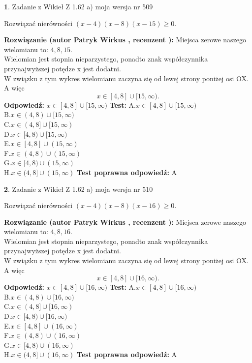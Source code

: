 \documentclass[12pt, a4paper]{article}
\theoremstyle{definition} %
\newtheorem{zad}{}
\newcommand{\zadStart}[1]{\begin{zad}#1\newline}
\newcommand{\zadStop}{\end{zad}}
\newcommand{\rozwStart}[2]{\noindent \textbf{Rozwiązanie (autor #1 , recenzent #2): }\newline}
\newcommand{\rozwStop}{\newline}
\newcommand{\odpStart}{\noindent \textbf{Odpowiedź:}\newline}
\newcommand{\odpStop}{\newline}
\newcommand{\testStart}{\noindent \textbf{Test:}\newline}
\newcommand{\testStop}{\newline}
\newcommand{\kluczStart}{\noindent \textbf{Test poprawna odpowiedź:}\newline}
\newcommand{\kluczStop}{\newline}
\begin{document}
\zadStart{Zadanie z Wikieł Z 1.62 a) moja wersja nr 509}

Rozwiązać nierówności $(x-4)(x-8)(x-15)\ge0$.
\zadStop
\rozwStart{Patryk Wirkus}{}
Miejsca zerowe naszego wielomianu to: $4, 8, 15$.\\
Wielomian jest stopnia nieparzystego, ponadto znak współczynnika przy\linebreak najwyższej potędze x jest dodatni.\\ W związku z tym wykres wielomianu zaczyna się od lewej strony poniżej osi OX. A więc $$x \in [4,8] \cup [15,\infty).$$
\rozwStop
\odpStart
$x \in [4,8] \cup [15,\infty)$
\odpStop
\testStart
A.$x \in [4,8] \cup [15,\infty)$\\
B.$x \in (4,8) \cup [15,\infty)$\\
C.$x \in (4,8] \cup [15,\infty)$\\
D.$x \in [4,8) \cup [15,\infty)$\\
E.$x \in [4,8] \cup (15,\infty)$\\
F.$x \in (4,8) \cup (15,\infty)$\\
G.$x \in [4,8) \cup (15,\infty)$\\
H.$x \in (4,8] \cup (15,\infty)$
\testStop
\kluczStart
A
\kluczStop



\zadStart{Zadanie z Wikieł Z 1.62 a) moja wersja nr 510}

Rozwiązać nierówności $(x-4)(x-8)(x-16)\ge0$.
\zadStop
\rozwStart{Patryk Wirkus}{}
Miejsca zerowe naszego wielomianu to: $4, 8, 16$.\\
Wielomian jest stopnia nieparzystego, ponadto znak współczynnika przy\linebreak najwyższej potędze x jest dodatni.\\ W związku z tym wykres wielomianu zaczyna się od lewej strony poniżej osi OX. A więc $$x \in [4,8] \cup [16,\infty).$$
\rozwStop
\odpStart
$x \in [4,8] \cup [16,\infty)$
\odpStop
\testStart
A.$x \in [4,8] \cup [16,\infty)$\\
B.$x \in (4,8) \cup [16,\infty)$\\
C.$x \in (4,8] \cup [16,\infty)$\\
D.$x \in [4,8) \cup [16,\infty)$\\
E.$x \in [4,8] \cup (16,\infty)$\\
F.$x \in (4,8) \cup (16,\infty)$\\
G.$x \in [4,8) \cup (16,\infty)$\\
H.$x \in (4,8] \cup (16,\infty)$
\testStop
\kluczStart
A
\kluczStop
\end{document}
